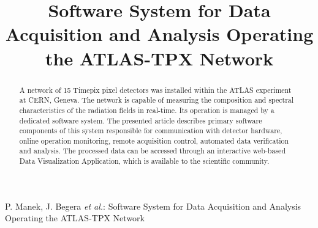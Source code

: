 \documentclass[conference,a4paper]{IEEEtran}
\begin{document}
\title{Software System for Data Acquisition and Analysis Operating the ATLAS-TPX Network}

\author{
}

\markboth{}%
{P. Manek, J. Begera \MakeLowercase{\textit{et al.}}: Software System for Data Acquisition and Analysis Operating the ATLAS-TPX Network}

\IEEEoverridecommandlockouts
{}

\maketitle


\begin{abstract}
A network of 15 Timepix pixel detectors was installed within the ATLAS experiment at CERN, Geneva. The network is capable of measuring the composition and spectral characteristics of the radiation fields in real-time. Its operation is managed by a dedicated software system. The presented article describes primary software components of this system responsible for communication with detector hardware, online operation monitoring, remote acquisition control, automated data verification and analysis. The processed data can be accessed through an interactive web-based Data Visualization Application, which is available to the scientific community.
\end{abstract}


















\balance

\end{document}
